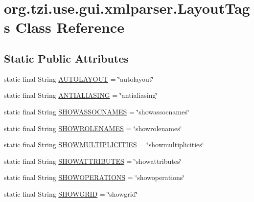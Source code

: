 \hypertarget{classorg_1_1tzi_1_1use_1_1gui_1_1xmlparser_1_1_layout_tags}{\section{org.\-tzi.\-use.\-gui.\-xmlparser.\-Layout\-Tags Class Reference}
\label{classorg_1_1tzi_1_1use_1_1gui_1_1xmlparser_1_1_layout_tags}
}
\subsection*{Static Public Attributes}
\begin{DoxyCompactItemize}
\item 
static final String \hyperlink{classorg_1_1tzi_1_1use_1_1gui_1_1xmlparser_1_1_layout_tags_a334fa7f888dd7041601e35f2ec1a8e45}{A\-U\-T\-O\-L\-A\-Y\-O\-U\-T} = \char`\"{}autolayout\char`\"{}
\item 
static final String \hyperlink{classorg_1_1tzi_1_1use_1_1gui_1_1xmlparser_1_1_layout_tags_ae27519a89f293c74a4d06b91b3063917}{A\-N\-T\-I\-A\-L\-I\-A\-S\-I\-N\-G} = \char`\"{}antialiasing\char`\"{}
\item 
static final String \hyperlink{classorg_1_1tzi_1_1use_1_1gui_1_1xmlparser_1_1_layout_tags_abd292dd8878b42c1fe3d0148a47f35a4}{S\-H\-O\-W\-A\-S\-S\-O\-C\-N\-A\-M\-E\-S} = \char`\"{}showassocnames\char`\"{}
\item 
static final String \hyperlink{classorg_1_1tzi_1_1use_1_1gui_1_1xmlparser_1_1_layout_tags_a787e8c405381ada59f4e831e1c1d1c2d}{S\-H\-O\-W\-R\-O\-L\-E\-N\-A\-M\-E\-S} = \char`\"{}showrolenames\char`\"{}
\item 
static final String \hyperlink{classorg_1_1tzi_1_1use_1_1gui_1_1xmlparser_1_1_layout_tags_af14761f00699ce2ead6d1f01dff3f587}{S\-H\-O\-W\-M\-U\-L\-T\-I\-P\-L\-I\-C\-I\-T\-I\-E\-S} = \char`\"{}showmultiplicities\char`\"{}
\item 
static final String \hyperlink{classorg_1_1tzi_1_1use_1_1gui_1_1xmlparser_1_1_layout_tags_a62e1622f667ce26b542f85aab8d1b5af}{S\-H\-O\-W\-A\-T\-T\-R\-I\-B\-U\-T\-E\-S} = \char`\"{}showattributes\char`\"{}
\item 
static final String \hyperlink{classorg_1_1tzi_1_1use_1_1gui_1_1xmlparser_1_1_layout_tags_a1ba6c68760c88be21233a7677b1ebb26}{S\-H\-O\-W\-O\-P\-E\-R\-A\-T\-I\-O\-N\-S} = \char`\"{}showoperations\char`\"{}
\item 
static final String \hyperlink{classorg_1_1tzi_1_1use_1_1gui_1_1xmlparser_1_1_layout_tags_afc4aa666bb19203b6829da4557a8b50e}{S\-H\-O\-W\-G\-R\-I\-D} = \char`\"{}showgrid\char`\"{}

\end{DoxyCompactItemize}
